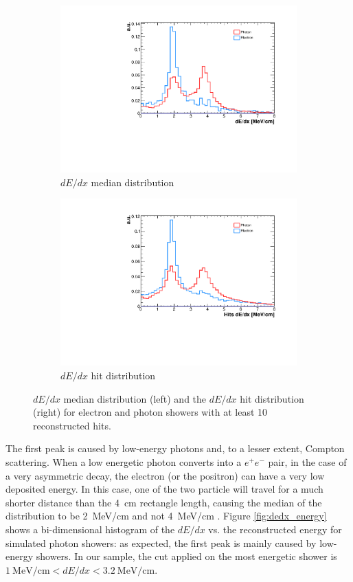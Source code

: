 \begin{figure}[htbp]
\centering
  \begin{subfigure}{0.45\textwidth}
    \includegraphics[width=\linewidth]{figures/dedx.pdf}
    \caption{$dE/dx$ median distribution} 
  \end{subfigure}
    \begin{subfigure}{0.45\textwidth}
    \includegraphics[width=\linewidth]{figures/hits_dedx.pdf}
    \caption{$dE/dx$ hit distribution} 
  \end{subfigure}
  \caption{$dE/dx$ median distribution (left) and the $dE/dx$ hit distribution (right) for electron and photon showers with at least 10 reconstructed hits.}\label{fig:dedx}
\end{figure}


The first peak is caused by low-energy photons and, to a lesser extent, Compton scattering. When a low energetic photon converts into a $e^+e^-$ pair, in the case of a very asymmetric decay, the electron (or the positron) can have a very low deposited energy. In this case, one of the two particle will travel for a much shorter distance than the 4~cm rectangle length, causing the median of the distribution to be 2~MeV/cm and not 4~MeV/cm \cite{caratelli}. Figure \ref{fig:dedx_energy} shows a bi-dimensional histogram of the $dE/dx$ vs. the reconstructed energy for simulated photon showers: as expected, the first peak is mainly caused by low-energy showers. In our sample, the cut applied on the most energetic shower is $1~\mathrm{MeV/cm} < dE/dx < 3.2~\mathrm{MeV/cm}$.


